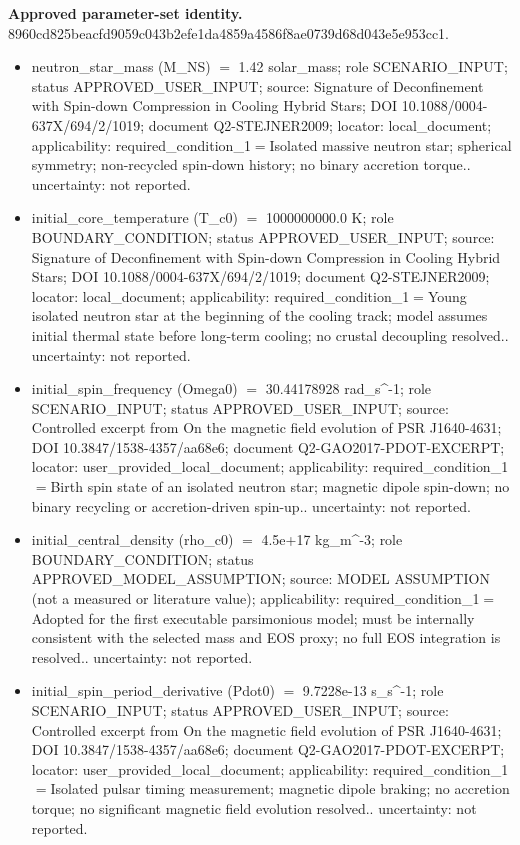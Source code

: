 \documentclass[11pt]{article}
\begin{document}
\noindent\textbf{Approved parameter-set identity.} 8960cd825beacfd9059c043b2efe1da4859a4586f8ae0739d68d043e5e953cc1.
\begin{itemize}
\item neutron\_star\_mass (M\_NS) \ensuremath{=} 1.42 solar\_mass; role SCENARIO\_INPUT; status APPROVED\_USER\_INPUT; source: Signature of Deconfinement with Spin-down Compression in Cooling Hybrid Stars; DOI 10.1088/0004-637X/694/2/1019; document Q2-STEJNER2009; locator: local\_document; applicability: required\_condition\_1\ensuremath{=}Isolated massive neutron star; spherical symmetry; non-recycled spin-down history; no binary accretion torque.. uncertainty: not reported.
\item initial\_core\_temperature (T\_c0) \ensuremath{=} 1000000000.0 K; role BOUNDARY\_CONDITION; status APPROVED\_USER\_INPUT; source: Signature of Deconfinement with Spin-down Compression in Cooling Hybrid Stars; DOI 10.1088/0004-637X/694/2/1019; document Q2-STEJNER2009; locator: local\_document; applicability: required\_condition\_1\ensuremath{=}Young isolated neutron star at the beginning of the cooling track; model assumes initial thermal state before long-term cooling; no crustal decoupling resolved.. uncertainty: not reported.
\item initial\_spin\_frequency (Omega0) \ensuremath{=} 30.44178928 rad\_s\textasciicircum{}-1; role SCENARIO\_INPUT; status APPROVED\_USER\_INPUT; source: Controlled excerpt from On the magnetic field evolution of PSR J1640-4631; DOI 10.3847/1538-4357/aa68e6; document Q2-GAO2017-PDOT-EXCERPT; locator: user\_provided\_local\_document; applicability: required\_condition\_1\ensuremath{=}Birth spin state of an isolated neutron star; magnetic dipole spin-down; no binary recycling or accretion-driven spin-up.. uncertainty: not reported.
\item initial\_central\_density (rho\_c0) \ensuremath{=} 4.5e+17 kg\_m\textasciicircum{}-3; role BOUNDARY\_CONDITION; status APPROVED\_MODEL\_ASSUMPTION; source: MODEL ASSUMPTION (not a measured or literature value); applicability: required\_condition\_1\ensuremath{=}Adopted for the first executable parsimonious model; must be internally consistent with the selected mass and EOS proxy; no full EOS integration is resolved.. uncertainty: not reported.
\item initial\_spin\_period\_derivative (Pdot0) \ensuremath{=} 9.7228e-13 s\_s\textasciicircum{}-1; role SCENARIO\_INPUT; status APPROVED\_USER\_INPUT; source: Controlled excerpt from On the magnetic field evolution of PSR J1640-4631; DOI 10.3847/1538-4357/aa68e6; document Q2-GAO2017-PDOT-EXCERPT; locator: user\_provided\_local\_document; applicability: required\_condition\_1\ensuremath{=}Isolated pulsar timing measurement; magnetic dipole braking; no accretion torque; no significant magnetic field evolution resolved.. uncertainty: not reported.

\end{itemize}
\end{document}

